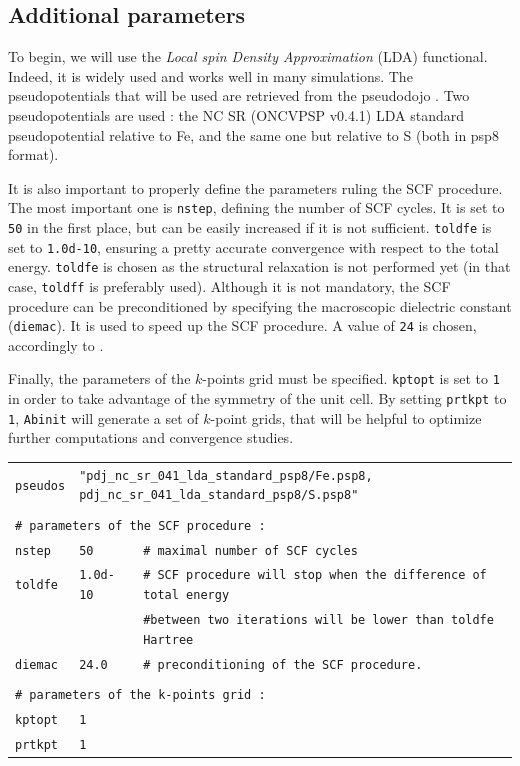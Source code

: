 \documentclass[11pt,a4paper]{article}
\begin{document}
\subsection{Additional parameters}
To begin, we will use the \textit{Local spin Density Approximation} (LDA) functional. Indeed, it is widely used and works well in many simulations. The pseudopotentials that will be used are retrieved from the pseudodojo \cite{PseudoDojo}. Two pseudopotentials are used : the NC SR (ONCVPSP v0.4.1) LDA standard pseudopotential relative to Fe, and the same one but relative to S (both in psp8 format).

It is also important to properly define the parameters ruling the SCF procedure. The most important one is \texttt{nstep}, defining the number of SCF cycles. It is set to \texttt{50} in the first place, but can be easily increased if it is not sufficient. \texttt{toldfe} is set to \texttt{1.0d-10}, ensuring a pretty accurate convergence with respect to the total energy. \texttt{toldfe} is chosen as the structural relaxation is not performed yet (in that case, \texttt{toldff} is preferably used). Although it is not mandatory, the SCF procedure can be preconditioned by specifying the macroscopic dielectric constant (\texttt{diemac}). It is used to speed up the SCF procedure. A value of \texttt{24} is chosen, accordingly to \cite{MaterialsProject}. 

Finally, the parameters of the $k$-points grid must be specified. \texttt{kptopt} is set to \texttt{1} in order to take advantage of the symmetry of the unit cell. 
By setting \texttt{prtkpt} to \texttt{1}, \texttt{Abinit} will generate a set of $k$-point grids, that will be helpful to optimize further computations and convergence studies.
\begin{center}
\begin{tabular}{lll}
\texttt{pseudos} & \multicolumn{2}{l}{\texttt{"pdj\_nc\_sr\_041\_lda\_standard\_psp8/Fe.psp8, pdj\_nc\_sr\_041\_lda\_standard\_psp8/S.psp8"}}\\
&&\\
\multicolumn{3}{l}{\texttt{\# parameters of the SCF procedure : }}\\
\texttt{nstep} & \texttt{50} &\texttt{\# maximal number of SCF cycles}\\
\texttt{toldfe} & \texttt{1.0d-10} &\texttt{\# SCF procedure will stop when the difference of total energy}\\
&&\texttt{\#\space\space\space\space between two iterations will be lower than toldfe Hartree}\\
\texttt{diemac} &\texttt{24.0} & \texttt{\# preconditioning of the SCF procedure.}\\
&&\\
\multicolumn{3}{l}{\texttt{\# parameters of the k-points grid : }}\\
\texttt{kptopt} & \texttt{1} &\\
\texttt{prtkpt} & \texttt{1} 
\end{tabular}
\end{center}
\end{document}
